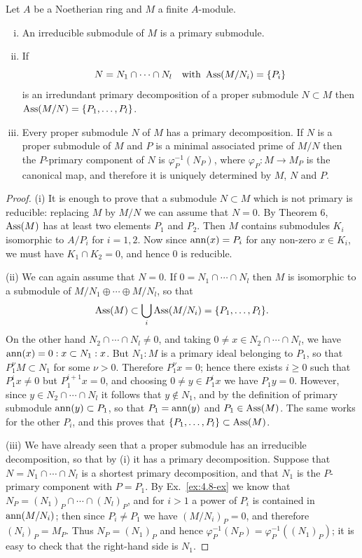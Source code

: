 \begin{theorem}\label{thm:6.8}
Let $A$ be a Noetherian ring and $M$ a finite $A$-module.
\begin{enumerate}[(i)]
  \item An irreducible submodule of $M$ is a primary submodule.
  \item If
        \[
          N = N_1 \cap \cdots \cap N_l \quad \text{with } \operatorname{Ass}(M/N_i) = \{P_i\}
        \]
        is an irredundant primary decomposition of a proper submodule $N \subset M$
        then $\operatorname{Ass}(M/N) = \{P_1, \ldots, P_l\}$.
  \item Every proper submodule $N$ of $M$ has a primary decomposition. If $N$ is
        a proper submodule of $M$ and $P$ is a minimal associated prime of $M/N$ then
        the $P$-primary component of $N$ is $\varphi_P^{-1}(N_P)$, where $\varphi_P\colon M \to M_P$ is the
        canonical map, and therefore it is uniquely determined by $M$, $N$ and $P$.
\end{enumerate}
\end{theorem}

\begin{proof}
(i) It is enough to prove that a submodule $N \subset M$ which is not
primary is reducible: replacing $M$ by $M/N$ we can assume that $N = 0$. By
Theorem 6, $\operatorname{Ass}(M)$ has at least two elements $P_1$ and $P_2$. Then $M$ contains
submodules $K_i$ isomorphic to $A/P_i$ for $i = 1, 2$. Now since $\operatorname{ann}(x) = P_i$ for
any non-zero $x \in K_i$, we must have $K_1 \cap K_2 = 0$, and hence $0$ is reducible.

(ii) We can again assume that $N = 0$. If $0 = N_1 \cap \cdots \cap N_l$ then $M$ is
isomorphic to a submodule of $M/N_1 \oplus \cdots \oplus M/N_l$, so that
\[
  \operatorname{Ass}(M) \subset \bigcup_i \operatorname{Ass}(M/N_i) = \{P_1, \ldots, P_l\}.
\]
On the other hand $N_2 \cap \cdots \cap N_l \neq 0$, and taking $0 \neq x \in N_2 \cap \cdots \cap N_l$, we
have $\operatorname{ann}(x) = 0:x \subset N_1:x$. But $N_1:M$ is a primary ideal belonging to $P_1$, so
that $P_1^\nu M \subset N_1$ for some $\nu > 0$. Therefore $P_1^\nu x = 0$; hence there exists $i \ge 0$
such that $P_1^i x \neq 0$ but $P_1^{i+1} x = 0$, and choosing $0 \neq y \in P_1^i x$ we have
$P_1y = 0$. However, since $y \in N_2 \cap \cdots \cap N_l$ it follows that $y \notin N_1$, and by
the definition of primary submodule $\operatorname{ann}(y) \subset P_1$, so that $P_1 = \operatorname{ann}(y)$ and
$P_1 \in \operatorname{Ass}(M)$. The same works for the other $P_i$, and this proves that
$\{P_1, \ldots, P_l\} \subset \operatorname{Ass}(M)$.

(iii) We have already seen that a proper submodule has an irreducible
decomposition, so that by (i) it has a primary decomposition. Suppose that
$N = N_1 \cap \cdots \cap N_l$ is a shortest primary decomposition, and that $N_1$ is the
$P$-primary component with $P = P_1$. By Ex.~\ref{ex:4.8-ex} we know that $N_P =
(N_1)_P \cap \cdots \cap (N_l)_P$, and for $i > 1$ a power of $P_i$ is contained in $\operatorname{ann}(M/N_i)$;
then since $P_i \neq P_1$ we have $(M/N_i)_P = 0$, and therefore $(N_i)_P = M_P$. Thus
$N_P = (N_1)_P$ and hence $\varphi_P^{-1}(N_P) = \varphi_P^{-1}((N_1)_P)$; it is easy to check that
the right-hand side is $N_1$.
\end{proof}

